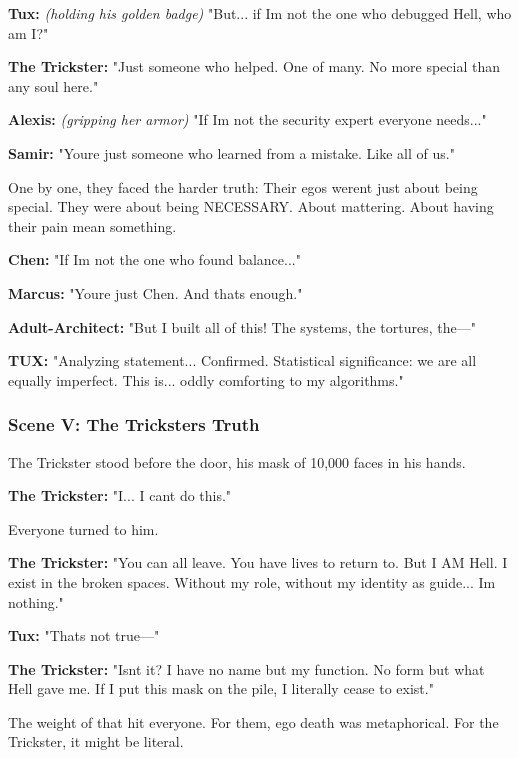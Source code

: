 \textbf{Tux:} \emph{(holding his golden badge)} "But... if I\textquotesingle m not the one who debugged Hell, who am I?"

\textbf{The Trickster:} "Just someone who helped. One of many. No more special than any soul here."

\textbf{Alexis:} \emph{(gripping her armor)} "If I\textquotesingle m not the security expert everyone needs..."

\textbf{Samir:} "You\textquotesingle re just someone who learned from a mistake. Like all of us."

One by one, they faced the harder truth: Their egos weren\textquotesingle t just about being special. They were about being NECESSARY. About mattering. About having their pain mean something.

\textbf{Chen:} "If I\textquotesingle m not the one who found balance..."

\textbf{Marcus:} "You\textquotesingle re just Chen. And that\textquotesingle s enough."

\textbf{Adult-Architect:} "But I built all of this! The systems, the tortures, the---"

\textbf{TUX:} "Analyzing statement... Confirmed. Statistical significance: we are all equally imperfect. This is... oddly comforting to my algorithms."

\bookdivider

\subsubsection{Scene V: The Trickster\textquotesingle s Truth}\label{scene-v-the-tricksters-truth}

The Trickster stood before the door, his mask of 10,000 faces in his hands.

\textbf{The Trickster:} "I... I can\textquotesingle t do this."

Everyone turned to him.

\textbf{The Trickster:} "You can all leave. You have lives to return to. But I AM Hell. I exist in the broken spaces. Without my role, without my identity as guide... I\textquotesingle m nothing."

\textbf{Tux:} "That\textquotesingle s not true---"

\textbf{The Trickster:} "Isn\textquotesingle t it? I have no name but my function. No form but what Hell gave me. If I put this mask on the pile, I literally cease to exist."

The weight of that hit everyone. For them, ego death was metaphorical. For the Trickster, it might be literal.

